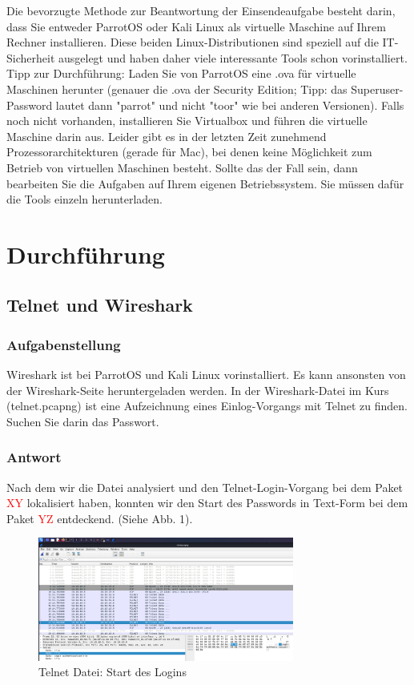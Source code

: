 \documentclass{article}
\begin{document}
Die bevorzugte Methode zur Beantwortung der Einsendeaufgabe besteht darin, dass Sie 
entweder ParrotOS oder Kali Linux als virtuelle Maschine auf Ihrem Rechner installieren. 
Diese beiden Linux-Distributionen sind speziell auf die IT-Sicherheit ausgelegt und haben 
daher viele interessante Tools schon vorinstalliert. 
Tipp zur Durchführung: Laden Sie von ParrotOS  eine .ova für virtuelle Maschinen herunter 
(genauer die .ova der Security Edition; Tipp: das Superuser-Password lautet dann "parrot" 
und nicht "toor" wie bei anderen Versionen). Falls noch nicht vorhanden, installieren Sie 
Virtualbox  und führen die virtuelle Maschine darin aus.
Leider gibt es in der letzten Zeit zunehmend Prozessorarchitekturen (gerade für Mac), bei 
denen keine Möglichkeit zum Betrieb von virtuellen Maschinen besteht. Sollte das der Fall 
sein, dann bearbeiten Sie die Aufgaben auf Ihrem eigenen Betriebssystem. Sie müssen dafür 
die Tools einzeln herunterladen.

\newpage

\section{Durchführung}

\subsection{Telnet und Wireshark}

\subsubsection*{Aufgabenstellung}

Wireshark ist bei ParrotOS und Kali Linux vorinstalliert. Es kann ansonsten von der 
Wireshark-Seite heruntergeladen werden. In der Wireshark-Datei im Kurs (telnet.pcapng) ist 
eine Aufzeichnung eines Einlog-Vorgangs mit Telnet zu finden. Suchen Sie darin das 
Passwort.

\subsubsection*{Antwort}

Nach dem wir die Datei analysiert und den Telnet-Login-Vorgang bei dem Paket 
\textcolor{red}{XY} lokalisiert haben, konnten wir den Start des Passwords in Text-Form 
bei dem Paket \textcolor{red}{YZ} entdeckend. (Siehe Abb. 1).

\begin{figure}[H]
	\includegraphics[width=0.75\textwidth]{images/01}
	\centering
	\caption{Telnet Datei: Start des Logins}
\end{figure}
\end{document}
